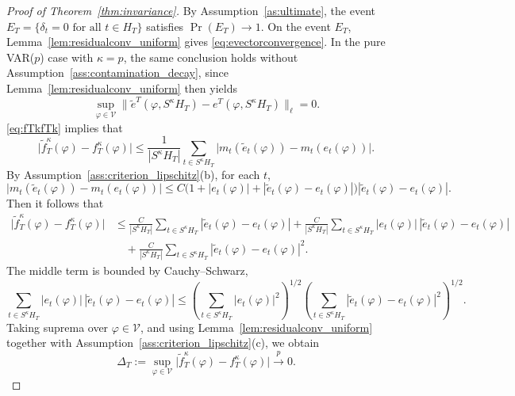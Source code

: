 \documentclass[12pt]{article}
\numberwithin{equation}{section}
\begin{document}
\begin{proof}[Proof of Theorem~\ref{thm:invariance}]
By Assumption~\ref{as:ultimate}, the event
$E_T=\{\delta_t=0 \text{ for all } t\in H_T\}$
satisfies $\Pr(E_T)\to 1$.
On the event $E_T$, Lemma~\ref{lem:residualconv_uniform} gives \eqref{eq:evectorconvergence}.
In the pure VAR($p$) case with $\kappa=p$, the same conclusion holds without Assumption~\ref{ass:contamination_decay}, since Lemma~\ref{lem:residualconv_uniform} then yields
\begin{equation}
\sup_{\varphi\in\mathcal V}
\|\tilde e^T(\varphi,S^\kappa H_T)-e^T(\varphi,S^\kappa H_T)\|_\ell
=0.
\end{equation}
\eqref{eq:fTkfTk} implies that
\begin{equation}
\bigl|
\tilde f_T^\kappa(\varphi)-f_T^\kappa(\varphi)
\bigr|
\le
\frac{1}{|S^\kappa H_T|}
\sum_{t\in S^\kappa H_T}
\bigl|
m_t(\tilde e_t(\varphi))-m_t(e_t(\varphi))
\bigr|.
\end{equation}
By Assumption~\ref{ass:criterion_lipschitz}(b), for each $t$,
\begin{equation}
\bigl|
m_t(\tilde e_t(\varphi))-m_t(e_t(\varphi))
\bigr|
\le
C\bigl(1+|e_t(\varphi)|+|\tilde e_t(\varphi)-e_t(\varphi)|\bigr)
|\tilde e_t(\varphi)-e_t(\varphi)|.
\end{equation}
Then it follows that
\begin{align}
\bigl|
\tilde f_T^\kappa(\varphi)-f_T^\kappa(\varphi)
\bigr|
&\le
\frac{C}{|S^\kappa H_T|}
\sum_{t\in S^\kappa H_T}
|\tilde e_t(\varphi)-e_t(\varphi)|
+
\frac{C}{|S^\kappa H_T|}
\sum_{t\in S^\kappa H_T}
|e_t(\varphi)|\,|\tilde e_t(\varphi)-e_t(\varphi)| \nonumber\\
&\quad+
\frac{C}{|S^\kappa H_T|}
\sum_{t\in S^\kappa H_T}
|\tilde e_t(\varphi)-e_t(\varphi)|^2.
\end{align}
The middle term is bounded by Cauchy--Schwarz,
\begin{equation}
\sum_{t\in S^\kappa H_T}
|e_t(\varphi)|\,|\tilde e_t(\varphi)-e_t(\varphi)|
\le
\left(
\sum_{t\in S^\kappa H_T}
|e_t(\varphi)|^2
\right)^{1/2}
\left(
\sum_{t\in S^\kappa H_T}
|\tilde e_t(\varphi)-e_t(\varphi)|^2
\right)^{1/2}.
\end{equation}
Taking suprema over $\varphi\in\mathcal V$, and using Lemma~\ref{lem:residualconv_uniform} together with Assumption~\ref{ass:criterion_lipschitz}(c), we obtain
\begin{equation}
\Delta_T
:=
\sup_{\varphi\in\mathcal V}
\bigl|
\tilde f_T^\kappa(\varphi)-f_T^\kappa(\varphi)
\bigr|
\overset{p}{\longrightarrow}0.
\end{equation}

\end{proof}
\end{document}
